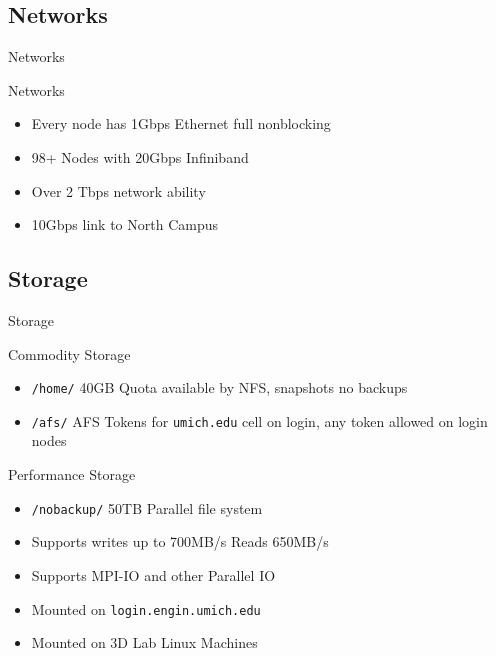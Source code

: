 \documentclass[handout]{beamer}
\begin{document}
   \subsection{Networks}
    \begin{frame}{Networks}
     \begin{block}{Networks}
      \begin{itemize}
       \item Every node has 1Gbps Ethernet full nonblocking
       \item 98+ Nodes with 20Gbps Infiniband
       \item Over 2 Tbps network ability
       \item 10Gbps link to North Campus
      \end{itemize}
     \end{block}
    \end{frame}
   \subsection{Storage}
    \begin{frame}{Storage}
     \begin{block}{Commodity Storage}
      \begin{itemize}
       \item \texttt{/home/} 40GB Quota available by NFS, snapshots no backups
       \item \texttt{/afs/} AFS Tokens for \texttt{umich.edu} cell on login, any token allowed on login nodes
      \end{itemize}
     \end{block}
     \begin{block}{Performance Storage}
      \begin{itemize}
        \item \texttt{/nobackup/} 50TB Parallel file system
        \item Supports writes up to 700MB/s Reads 650MB/s
        \item Supports MPI-IO and other Parallel IO
        \item Mounted on \texttt{login.engin.umich.edu}
        \item Mounted on 3D Lab Linux Machines
      \end{itemize}
     \end{block}
    \end{frame}
\end{document}
